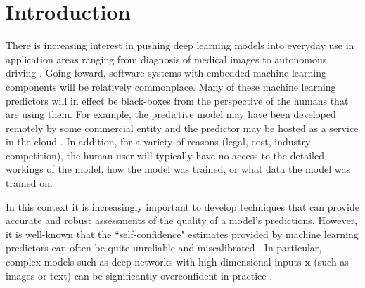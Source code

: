 \documentclass{article}
\newcommand{\ux}{{\mathbf{x}}}
\newcommand{\robby}[1]{\textcolor{Red}{[#1]\textsubscript{Robby}}}
\begin{document}
\section{Introduction}


There is increasing interest in pushing deep learning models into everyday use in application areas ranging from   diagnosis of medical images \cite{kermany2018identifying} to autonomous driving \cite{du2017fused}. Going foward, software systems with embedded machine learning components will be relatively commonplace.
Many of these machine learning predictors will in effect be black-boxes from the perspective of  the humans that are using them. For example, the predictive model may have been developed remotely by some commercial entity  and the predictor may be hosted as a  service in the cloud  \cite{sanyal2018tapas}.
In addition, for a variety of reasons (legal, cost, industry competition), the human user will typically have no access to the detailed workings of the model, how the model was trained, or what data the model was trained on.

In this context it is increasingly important to develop techniques that can provide accurate and robust assessments of the quality of a model's predictions.
However, it is well-known that the ``self-confidence" estimates provided by machine learning predictors can often be quite unreliable and miscalibrated \cite{zadrozny2002transforming,kull2017a}.
In particular, complex models such as deep networks with high-dimensional inputs $\ux$ (such as images or text) can be significantly overconfident in practice \cite{gal2016dropout, guo2017calibration,lakshminarayanan2017simple,kuleshov2018accurate, keren2018calibrated}.
\end{document}

